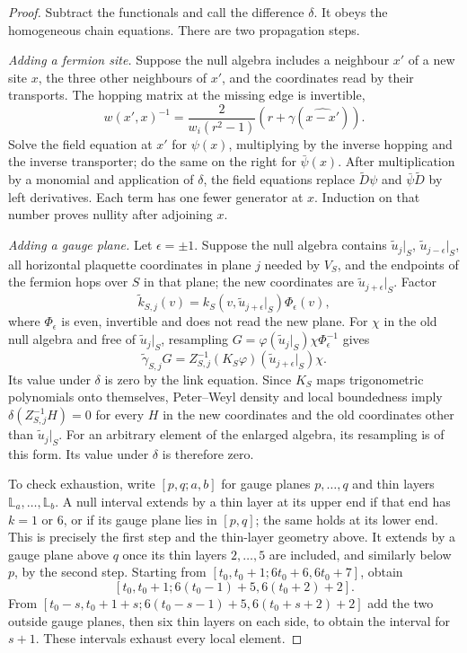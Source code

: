 \documentclass[11pt,letterpaper,reqno]{amsart}
\theoremstyle{definition}
\theoremstyle{remark}
\begin{document}
\begin{proof}
Subtract the functionals and call the difference $\delta$.
It obeys the homogeneous chain equations. There are two
propagation steps.

\emph{Adding a fermion site.} Suppose the null algebra includes
a neighbour $x'$ of a new site $x$, the three other neighbours
of $x'$, and the coordinates read by their transports.
The hopping matrix at the missing edge is invertible,
\[
 w(x',x)^{-1}=\frac2{w_i(r^2-1)}(r+\gamma(\widehat{x-x'})).
\]
Solve the field equation at $x'$ for $\psi(x)$, multiplying
by the inverse hopping and the inverse transporter; do the same
on the right for $\bar\psi(x)$. After multiplication by a
monomial and application of $\delta$, the field equations
replace $\widetilde D\psi$ and $\bar\psi\widetilde D$ by
left derivatives. Each term has one fewer generator at $x$.
Induction on that number proves nullity after adjoining $x$.

\emph{Adding a gauge plane.} Let $\epsilon=\pm1$.
Suppose the null algebra contains $\widetilde u_j|_S$,
$\widetilde u_{j-\epsilon}|_S$, all horizontal plaquette
coordinates in plane $j$ needed by $V_S$, and the endpoints
of the fermion hops over $S$ in that plane; the new coordinates
are $\widetilde u_{j+\epsilon}|_S$. Factor
\[
 \widetilde k_{S,j}(v)
       =k_S(v,\widetilde u_{j+\epsilon}|_S)\Phi_\epsilon(v),
\]
where $\Phi_\epsilon$ is even, invertible and does not read
the new plane. For $\chi$ in the old null algebra and free of
$\widetilde u_j|_S$,
resampling
$G=\varphi(\widetilde u_j|_S)\chi\Phi_\epsilon^{-1}$
gives
\[
 \widetilde\gamma_{S,j}G
       =Z_{S,j}^{-1}(K_S\varphi)
                     (\widetilde u_{j+\epsilon}|_S)\chi.
\]
Its value under $\delta$ is zero by the link equation.
Since $K_S$ maps trigonometric polynomials onto themselves,
Peter--Weyl density \cite[Thm.~37.5(ii)]{Etingof} and local boundedness imply
$\delta(Z_{S,j}^{-1}H)=0$ for every $H$ in the new coordinates
and the old coordinates other than $\widetilde u_j|_S$.
For an arbitrary element of the enlarged algebra, its resampling
is of this form. Its value under $\delta$ is therefore zero.

To check exhaustion, write $[p,q;a,b]$ for gauge planes
$p,\ldots,q$ and thin layers $\mathbb L_a,\ldots,\mathbb L_b$.
A null interval extends by a thin layer at its upper end if
that end has $k=1$ or $6$, or if its gauge plane lies in $[p,q]$;
the same holds at its lower end. This is precisely the first
step and the thin-layer geometry above. It extends by a gauge
plane above $q$ once its thin layers $2,\ldots,5$ are included,
and similarly below $p$, by the second step. Starting from
$[t_0,t_0+1;6t_0+6,6t_0+7]$, obtain
\[
 [t_0,t_0+1;6(t_0-1)+5,6(t_0+2)+2].
\]
From
$[t_0-s,t_0+1+s;6(t_0-s-1)+5,6(t_0+s+2)+2]$
add the two outside gauge planes, then six thin layers on
each side, to obtain the interval for $s+1$.
These intervals exhaust every local element.
\end{proof}
\end{document}
